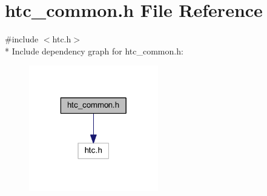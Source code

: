 \section{htc\-\_\-common.\-h File Reference}
\label{htc__common_8h}
{\ttfamily \#include $<$htc.\-h$>$}\\*
Include dependency graph for htc\-\_\-common.\-h\-:\nopagebreak
\begin{figure}[H]
\begin{center}
\leavevmode
\includegraphics[width=160pt]{htc__common_8h__incl}
\end{center}
\end{figure}
